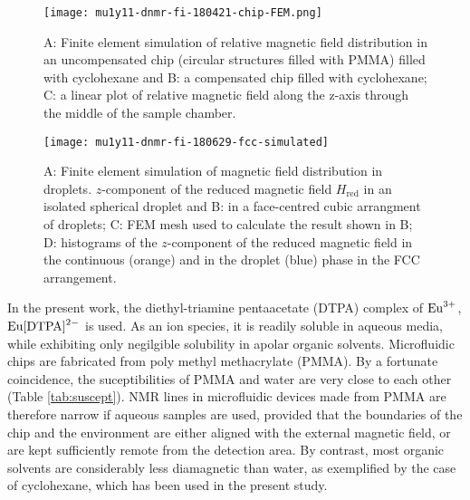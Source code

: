 \begin{figure}
  \begin{center}
    \texttt{[image: mu1y11-dnmr-fi-180421-chip-FEM.png]}
  \end{center}
  \caption{A: Finite element simulation of relative magnetic field distribution in an uncompensated chip (circular structures filled with PMMA) filled with cyclohexane
      and B: a compensated chip filled with cyclohexane; C: a linear plot of relative magnetic field along the z-axis through the middle of the sample chamber.
    }
  \label{fig:FEM-chip}
\end{figure}


\begin{figure}
  \begin{center}
    \texttt{[image: mu1y11-dnmr-fi-180629-fcc-simulated]}
  \end{center}
  \caption{A: Finite element simulation of magnetic field distribution in droplets.
      $z$-component of the reduced magnetic field $H_\text{red}$ in an isolated spherical droplet
      and B: in a face-centred cubic arrangment of droplets; C: FEM mesh used
      to calculate the result shown in B; D: histograms of the $z$-component
      of the reduced magnetic field in the continuous (orange) and in the droplet (blue) phase
      in the FCC arrangement.
    }
  \label{fig:FEM-fcc}
\end{figure}


In the present work, the diethyl-triamine pentaacetate (DTPA) complex
of $\ce{Eu^{3+}}$, $\ce{Eu[DTPA]^{2-}}$ is used. As an ion species, it is readily soluble
in aqueous media, while exhibiting only negilgible solubility in apolar organic
solvents. Microfluidic chips are fabricated from poly methyl methacrylate (PMMA).
By a fortunate coincidence, the suceptibilities of PMMA and
water are very close to
each other (Table \ref{tab:suscept}).  NMR lines
in microfluidic devices made from PMMA are therefore narrow
if  aqueous samples are used, provided that the boundaries of the chip and the environment
are either aligned with the external magnetic field, or are kept sufficiently
remote from the detection area. By contrast, most organic solvents are
considerably less diamagnetic than water, as exemplified by the
case of cyclohexane, which has been used in the present study.


